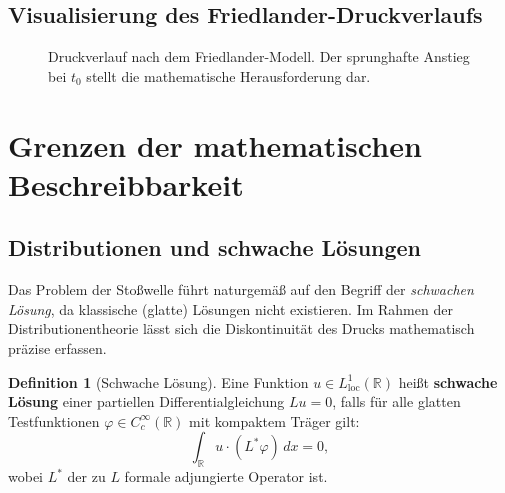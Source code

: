 ﻿\documentclass[12pt,a4paper]{article}
\theoremstyle{definition}
\newtheorem{definition}[theorem]{Definition}
\theoremstyle{remark}
\begin{document}
\subsection{Visualisierung des Friedlander-Druckverlaufs}

\begin{figure}[H]
\centering
{}
\caption{Druckverlauf nach dem Friedlander-Modell. Der sprunghafte Anstieg bei $t_0$ stellt die mathematische Herausforderung dar.}
\end{figure}

\section{Grenzen der mathematischen Beschreibbarkeit}

\subsection{Distributionen und schwache Lösungen}

Das Problem der Stoßwelle führt naturgemäß auf den Begriff der \emph{schwachen Lösung}, da klassische (glatte) Lösungen nicht existieren. Im Rahmen der Distributionentheorie lässt sich die Diskontinuität des Drucks mathematisch präzise erfassen.

\begin{definition}[Schwache Lösung]
\label{def:schwache_loesung}
Eine Funktion $u \in L^1_{\text{loc}}(\mathbb{R})$ heißt \textbf{schwache Lösung} einer partiellen Differentialgleichung $Lu = 0$, falls für alle glatten Testfunktionen $\varphi \in C_c^\infty(\mathbb{R})$ mit kompaktem Träger gilt:
\begin{equation}
\int_\mathbb{R} u \cdot (L^*\varphi)\,dx = 0,
\end{equation}
wobei $L^*$ der zu $L$ formale adjungierte Operator ist.
\end{definition}
\end{document}
